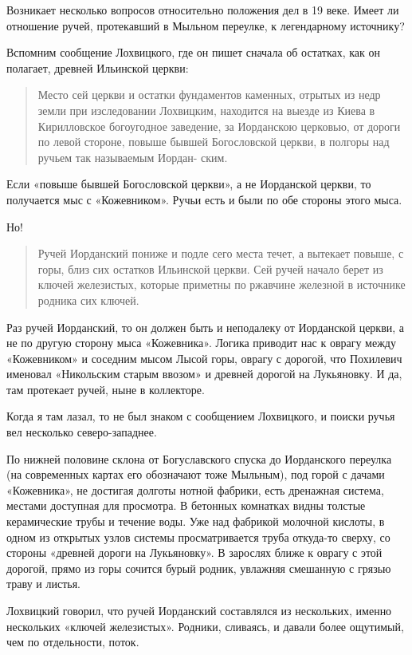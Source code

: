 Возникает несколько вопросов относительно положения дел в 19 веке. Имеет ли отношение ручей, протекавший в Мыльном переулке, к легендарному источнику?

Вспомним сообщение Лохвицкого, где он пишет сначала об остатках, как он полагает, древней Ильинской церкви: 

\begin{quotation}
Место сей церкви и остатки фундаментов
каменных, отрытых из недр земли при изследовании Лохвицким, находится на выезде из Киева в Кирилловское богоугодное заведение,
за Иорданскою церковью, от дороги по левой
стороне, повыше бывшей Богословской церкви,
в полгоры над ручьем так называемым Иордан-
ским.
\end{quotation}

Если «повыше бывшей Богословской церкви», а не Иорданской церкви, то получается мыс с «Кожевником». Ручьи есть и были по обе стороны этого мыса.

Но!

\begin{quotation}
Ручей Иорданский пониже и подле сего места течет, а вытекает повыше, с горы, близ сих остатков Ильинской церкви. Сей ручей начало берет из ключей железистых, которые приметны по ржавчине железной в источнике родника сих ключей.
\end{quotation}

Раз ручей Иорданский, то он должен быть и неподалеку от Иорданской церкви, а не по другую сторону мыса «Кожевника». Логика приводит нас к оврагу между «Кожевником» и соседним мысом Лысой горы, оврагу с дорогой, что Похилевич именовал «Никольским старым ввозом» и древней дорогой на Лукьяновку. И да, там протекает ручей, ныне в коллекторе.

Когда я там лазал, то не был знаком с сообщением Лохвицкого, и поиски ручья вел несколько северо-западнее.

По нижней половине склона от Богуславского спуска до Иорданского переулка (на современных картах его обозначают тоже Мыльным), под горой с дачами «Кожевника», не достигая долготы нотной фабрики, есть дренажная система, местами доступная для просмотра. В бетонных комнатках видны толстые керамические трубы и течение воды. Уже над фабрикой молочной кислоты, в одном из открытых узлов системы просматривается труба откуда-то сверху, со стороны «древней дороги на Лукьяновку». В зарослях ближе к оврагу с этой дорогой, прямо из горы сочится бурый родник, увлажняя смешанную с грязью траву и листья.

Лохвицкий говорил, что ручей Иорданский составлялся из нескольких, именно нескольких «ключей железистых». Родники, сливаясь, и давали более ощутимый, чем по отдельности, поток.

